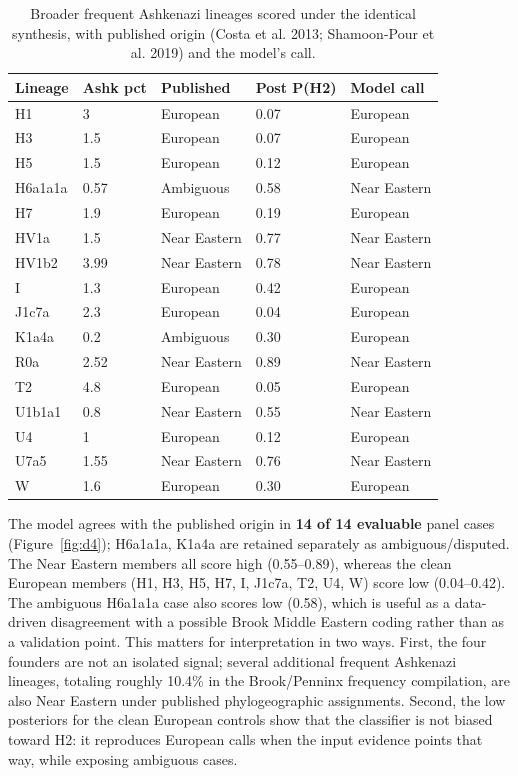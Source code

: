 \documentclass[11pt]{article}
\begin{document}
\begin{table}[htbp]
\centering
\footnotesize
\caption{Broader frequent Ashkenazi lineages scored under the identical synthesis, with published origin (Costa et al. 2013; Shamoon-Pour et al. 2019) and the model's call.}
\label{tab:major}
\begin{tabular}{lllll}
\toprule
Lineage & Ashk pct & Published & Post P(H2) & Model call \\
\midrule
H1 &     3 & European & 0.07 & European \\
H3 &   1.5 & European & 0.07 & European \\
H5 &   1.5 & European & 0.12 & European \\
H6a1a1a &  0.57 & Ambiguous & 0.58 & Near Eastern \\
H7 &   1.9 & European & 0.19 & European \\
HV1a &   1.5 & Near Eastern & 0.77 & Near Eastern \\
HV1b2 &  3.99 & Near Eastern & 0.78 & Near Eastern \\
I &   1.3 & European & 0.42 & European \\
J1c7a &   2.3 & European & 0.04 & European \\
K1a4a &   0.2 & Ambiguous & 0.30 & European \\
R0a &  2.52 & Near Eastern & 0.89 & Near Eastern \\
T2 &   4.8 & European & 0.05 & European \\
U1b1a1 &   0.8 & Near Eastern & 0.55 & Near Eastern \\
U4 &     1 & European & 0.12 & European \\
U7a5 &  1.55 & Near Eastern & 0.76 & Near Eastern \\
W &   1.6 & European & 0.30 & European \\
\bottomrule
\end{tabular}
\end{table}
The model agrees with the published origin in \textbf{14 of 14 evaluable} panel cases (Figure~\ref{fig:d4}); H6a1a1a, K1a4a are retained separately as ambiguous/disputed. The Near Eastern members all score high (0.55--0.89), whereas the clean European members (H1, H3, H5, H7, I, J1c7a, T2, U4, W) score low (0.04--0.42). The ambiguous H6a1a1a case also scores low (0.58), which is useful as a data-driven disagreement with a possible Brook Middle Eastern coding rather than as a validation point. This matters for interpretation in two ways. First, the four founders are not an isolated signal; several additional frequent Ashkenazi lineages, totaling roughly 10.4\% in the Brook/Penninx frequency compilation, are also Near Eastern under published phylogeographic assignments. Second, the low posteriors for the clean European controls show that the classifier is not biased toward H2: it reproduces European calls when the input evidence points that way, while exposing ambiguous cases.
\end{document}
